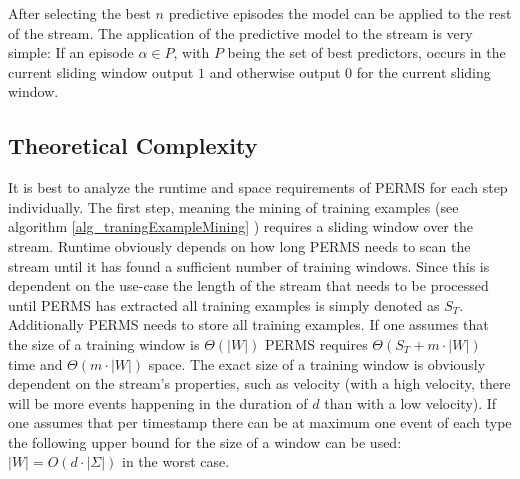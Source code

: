 After selecting the best $n$ predictive episodes the model can be applied to the rest of the stream.
The application of the predictive model to the stream is very simple: If an episode $\alpha \in P$, with $P$ being the set of best predictors, occurs in the current sliding window output $1$ and otherwise output $0$ for the current sliding window.
\subsection{Theoretical Complexity}
\label{subsec_permsComplexity}
It is best to analyze the runtime and space requirements of PERMS for each step individually. The first step, meaning the mining of training examples (see algorithm \ref{alg_traningExampleMining} ) requires a sliding window over the stream. Runtime obviously depends on how long PERMS needs to scan the stream until it has found a sufficient number of training windows. Since this is dependent on the use-case the length of the stream that needs to be processed until PERMS has extracted all training examples is simply denoted as $S_T$. Additionally PERMS needs to store all training examples. If one assumes that the size of a training window is $\Theta(|W|)$ PERMS requires $\Theta(S_T + m\cdot |W|)$ time and $\Theta(m\cdot |W|)$ space. The exact size of a training window is obviously dependent on the stream's properties, such as velocity (with a high velocity, there will be more events happening in the duration of $d$ than with a low velocity). If one assumes that per timestamp there can be at maximum one event of each type the following upper bound for the size of a window can be used: $|W| = O(d\cdot |\Sigma|)$ in the worst case. \\
